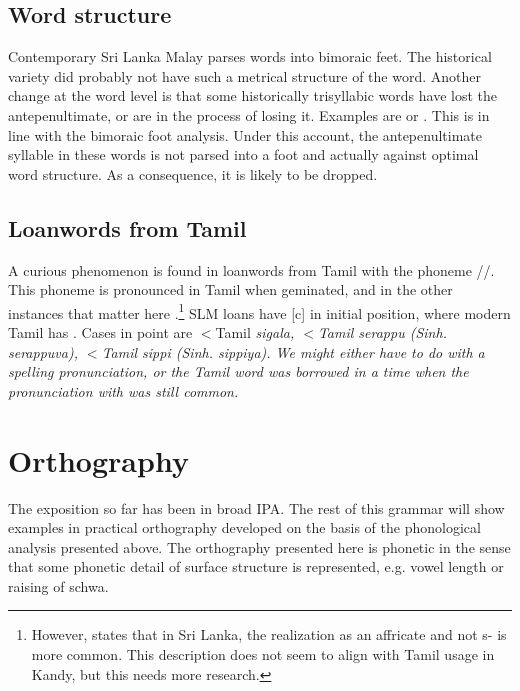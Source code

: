 \subsection{Word structure}
Contemporary Sri Lanka Malay parses words into bimoraic feet. The historical variety did probably not have such a metrical structure of the word. Another change at the word level is that some historically trisyllabic words have lost the antepenultimate, or are in the process of losing it. Examples are  or  \citep[cf.][419]{Hussein2007}. This is in line with the bimoraic foot analysis. Under this account, the antepenultimate syllable in these words is not parsed into a foot and actually against optimal word structure.
As a consequence, it is likely to be dropped.

\subsection{Loanwords from Tamil}
A curious phenomenon is found in loanwords from Tamil with the phoneme /{\btam \TAMc \etam }/. This phoneme is pronounced  in Tamil when geminated, and  in the other instances that matter here \citep[cf.][9,13]{Schiffman1999}.\footnote{However, \citet[174]{Suseendirarajah1973phon} states that in Sri Lanka, the realization as an affricate and not s- is more common. This description does not seem to align with Tamil usage in Kandy, but this needs more research.} SLM loans have [c] in initial position, where modern Tamil has .  Cases in point are $<$Tamil \em si\ng gala\em, $<$Tamil \em serappu \em (Sinh. \em serappuva\em),  $<$Tamil \em sippi \em (Sinh. \em sippiya\em). We might either have to do with a spelling pronunciation, or the Tamil word was borrowed in a time when the pronunciation with  was still common.


\section{Orthography}\label{sec:phon:Orthography}

The exposition so far has been in broad IPA. The rest of this grammar will show examples in  practical orthography developed on the basis of the phonological analysis presented above. The orthography presented here is phonetic in the sense that some phonetic detail of surface structure is represented, e.g. vowel length or raising of schwa.

